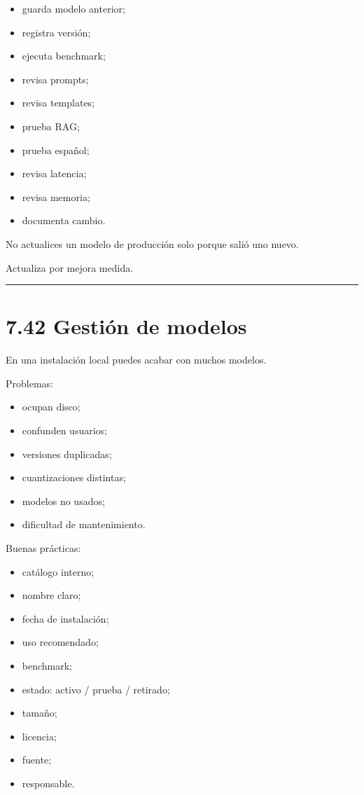 \begin{itemize}
\tightlist
\item
  guarda modelo anterior;
\item
  registra versión;
\item
  ejecuta benchmark;
\item
  revisa prompts;
\item
  revisa templates;
\item
  prueba RAG;
\item
  prueba español;
\item
  revisa latencia;
\item
  revisa memoria;
\item
  documenta cambio.
\end{itemize}

No actualices un modelo de producción solo porque salió uno nuevo.

Actualiza por mejora medida.

\begin{center}\rule{0.5\linewidth}{0.5pt}\end{center}

\section{7.42 Gestión de modelos}\label{gestiuxf3n-de-modelos}

En una instalación local puedes acabar con muchos modelos.

Problemas:

\begin{itemize}
\tightlist
\item
  ocupan disco;
\item
  confunden usuarios;
\item
  versiones duplicadas;
\item
  cuantizaciones distintas;
\item
  modelos no usados;
\item
  dificultad de mantenimiento.
\end{itemize}

Buenas prácticas:

\begin{itemize}
\tightlist
\item
  catálogo interno;
\item
  nombre claro;
\item
  fecha de instalación;
\item
  uso recomendado;
\item
  benchmark;
\item
  estado: activo / prueba / retirado;
\item
  tamaño;
\item
  licencia;
\item
  fuente;
\item
  responsable.
\end{itemize}

